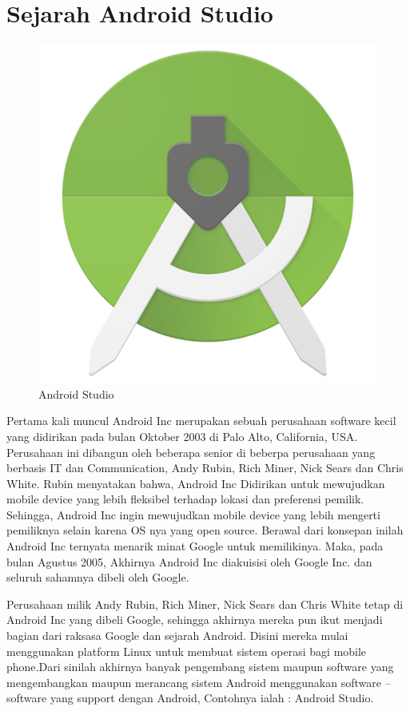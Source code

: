 \section{Sejarah Android Studio}
\begin{figure}[!htbp]
    \centering
    \includegraphics[scale=0.05]{pictures/android-studio.png}
    \caption{Android Studio}
    \label{}
\end{figure}
Pertama kali muncul Android Inc merupakan sebuah perusahaan software kecil yang didirikan pada bulan Oktober 2003 di Palo Alto, California, USA. Perusahaan ini dibangun oleh beberapa senior di beberpa perusahaan yang berbasis IT dan Communication, Andy Rubin, Rich Miner, Nick Sears dan Chris White. Rubin menyatakan bahwa, Android Inc Didirikan untuk mewujudkan mobile device yang lebih fleksibel terhadap lokasi dan preferensi pemilik. Sehingga, Android Inc ingin mewujudkan mobile device yang lebih mengerti pemiliknya selain karena OS nya yang open source. Berawal dari konsepan inilah Android Inc ternyata menarik minat Google untuk memilikinya. Maka, pada bulan Agustus 2005, Akhirnya Android Inc diakuisisi oleh Google Inc. dan seluruh sahamnya dibeli oleh Google.

Perusahaan milik Andy Rubin, Rich Miner, Nick Sears dan Chris White tetap di Android Inc yang dibeli Google, sehingga akhirnya mereka pun ikut  menjadi bagian dari raksasa Google dan sejarah Android. Disini mereka mulai menggunakan platform Linux untuk membuat sistem operasi bagi mobile phone.Dari sinilah akhirnya banyak pengembang sistem maupun software yang mengembangkan maupun merancang sistem Android menggunakan software – software yang support dengan Android, Contohnya ialah : Android Studio.